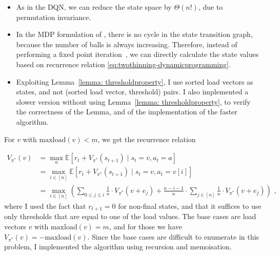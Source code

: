 \begin{itemize}
    \item 
    As in the DQN, we can reduce the state space by $\Theta(n!)$, due to permutation invariance.
    \item
    In the MDP formulation of \TwoThinning, there is no cycle in the state transition graph, because the number of balls is always increasing. Therefore, instead of performing a fixed point iteration~\cite{rhoades1991fixedpointiteration}, we can directly calculate the state values based on recurrence relation \eqref{eq:twothinning-dynamicprogramming}.
    \item
    Exploiting Lemma~\ref{lemma: thresholdproperty}, I use sorted load vectors as states, and not (sorted load vector, threshold) pairs. I also implemented a slower version without using Lemma~\ref{lemma: thresholdproperty}, to verify the correctness of the Lemma, and of the implementation of the faster algorithm.
\end{itemize}


For $v$ with $\mathrm{maxload}(v)<m$, we get the recurrence relation

\begin{equation} \label{eq:twothinning-dynamicprogramming}
\begin{split}
    V_{\pi^*}(v) &= \max_a \mathbb{E} [r_t + V_{\pi^*}(s_{t+1}) \mid s_t=v, a_t=a] \\
    &= \max_{i \in [n]} \mathbb{E} [r_t + V_{\pi^*}(s_{t+1}) \mid s_t=v, a_t=v[i]] \\
    &= \max_{i \in [n]} \left(\sum_{0\leq j \leq i} \frac{1}{n}\cdot V_{\pi^*}(v+e_j) + \frac{n-i-1}{n} \cdot  \sum_{j \in [n]} \frac{1}{n}\cdot V_{\pi^*}(v+e_j) \right) \text{ ,}
\end{split}
\end{equation}
where I used the fact that $r_{t+1}=0$ for non-final states, and that it suffices to use only thresholds that are equal to one of the load values. The base cases are load vectors $v$ with $\mathrm{maxload}(v)=m$, and for those we have $V_{\pi^*}(v)=-\mathrm{maxload}(v)$. Since the base cases are difficult to enumerate in this problem, I implemented the algorithm using recursion and memoisation. 


